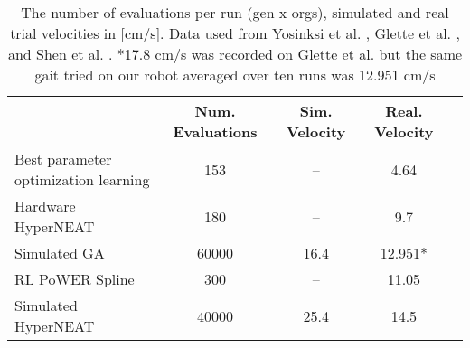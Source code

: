 \begin{table}
\caption{The number of evaluations per run (gen x orgs), simulated and real trial velocities in [cm/s]. Data used from Yosinksi et al. \cite{yos:clune}, Glette et al. \cite{glette}, and Shen et al. \cite{haocheng}.
*17.8 cm/s was recorded on Glette et al. \cite{glette} but the same gait tried on our robot averaged over ten runs was 12.951 cm/s}  %
\begin{center}
\begin{tabular}{|l|c|c|c|c|}
\hline
                                         & Num. Evaluations  & Sim. Velocity  & Real. Velocity \\
\hline
Best parameter optimization learning    &153    & --    & 4.64 \\
\hline
Hardware HyperNEAT                  & 180         & --         &   9.7     \\
\hline
Simulated GA              & 60000       & 16.4       &   12.951*     \\
\hline
RL PoWER Spline                          & 300         & --         &   11.05 \\
\hline
Simulated HyperNEAT                      & 40000       & 25.4       &   14.5 \\
\hline
\end{tabular}
\end{center}
\end{table}

%
%



